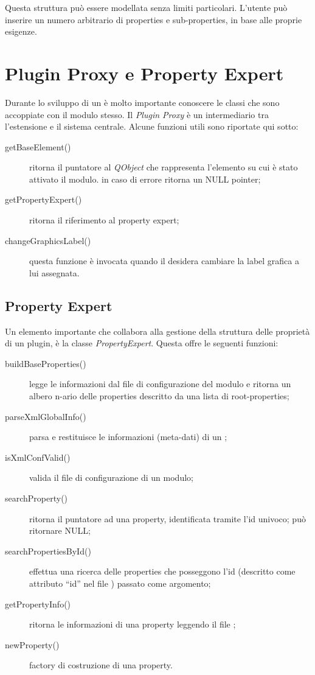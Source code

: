 Questa struttura può essere modellata senza limiti particolari. L'utente può inserire un numero arbitrario di properties e sub-properties, in base alle proprie esigenze.

\section*{Plugin Proxy e Property Expert}
Durante lo sviluppo di un \plugin{} è molto importante conoscere le classi che sono accoppiate con il modulo stesso. Il \emph{Plugin Proxy} è un intermediario tra l'estensione e il sistema centrale. Alcune funzioni utili sono riportate qui sotto:
\begin{description}
\item[getBaseElement()] ritorna il puntatore al \emph{QObject} che rappresenta l'elemento su cui è stato attivato il modulo. in caso di errore ritorna un NULL pointer;

\item[getPropertyExpert()] ritorna il riferimento al property expert;

\item[changeGraphicsLabel()] questa funzione è invocata quando il \plugin{} desidera cambiare la label grafica a lui assegnata. 
\end{description}

\subsection*{Property Expert}
Un elemento importante che collabora alla gestione della struttura delle proprietà di un plugin, è la classe \emph{PropertyExpert}. Questa offre le seguenti funzioni:
\begin{description}
\item[buildBaseProperties()] legge le informazioni dal file di configurazione del modulo e ritorna un albero n-ario delle properties descritto da una lista di root-properties;

\item[parseXmlGlobalInfo()] parsa e restituisce le informazioni (meta-dati) di un \plugin{};

\item[isXmlConfValid()] valida il file di configurazione di un modulo;

\item[searchProperty()] ritorna il puntatore ad una property, identificata tramite l'id univoco; può ritornare NULL;

\item[searchPropertiesById()] effettua una ricerca delle properties che posseggono l'id (descritto come attributo ``id'' nel file \xml{}) passato come argomento;

\item[getPropertyInfo()] ritorna le informazioni di una property leggendo il file \xml{};

\item[newProperty()] factory di costruzione di una property.

\end{description}
